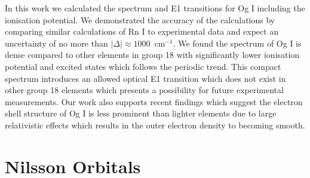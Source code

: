 \documentclass[8pt,a4paper, twoside]{report}
\begin{document}
In this work we calculated the spectrum and E1 transitions for Og I including the ionisation potential. We demonstrated the accuracy of the calculations by comparing similar calculations of Rn I to experimental data and expect an uncertainty of no more than $|\Delta| \approx 1000$~cm$^{-1}$. We found the spectrum of Og I is dense compared to other elements in  group 18 with significantly lower ionisation potential and excited states which follows the periodic trend. This compact spectrum introduces an allowed optical E1 transition which does not exist in other group 18 elements which presents a possibility for future experimental measurements. Our work also supports recent findings\cite{Jerabek2018} which suggest the electron shell structure of Og I is less prominent than lighter elements due to large relativistic effects which results in the outer electron density to becoming smooth. \\


\appendix



\chapter{Nilsson Orbitals}
\end{document}

